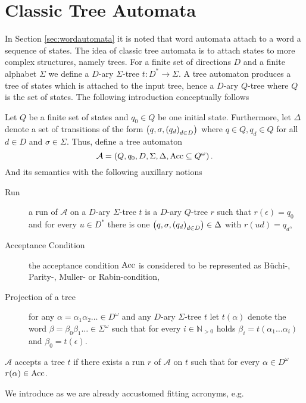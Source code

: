\section{Classic Tree Automata}
In Section \ref{sec:wordautomata} it is noted that word automata attach to a
word a sequence of states. The idea of classic tree automata is to attach
states to more complex structures, namely trees. For a finite set of
directions $D$ and a finite alphabet $\Sigma$ we define a $D$-ary $\Sigma$-tree
$t:D^{*}\rightarrow\Sigma$. A tree automaton produces a tree of states
which is attached to the input tree, hence a $D$-ary $Q$-tree where $Q$ is the
set of states. The following introduction conceptually follows 
\cite[Chapter 8]{AutoLogInfGames}
\begin{definition}
  Let $Q$ be a finite set of states and $q_{0}\in Q$ be one initial state.
  Furthermore, let $\Delta$ denote a set of transitions of the form
  $\left(q,\sigma, \left(q_{d}\right)_{d\in D}\right)$ where $q\in Q, q_{d}\in Q$ for
  all $d\in D$ and $\sigma\in\Sigma$. Thus, define a tree automaton
  \begin{equation*}
    \mathcal{A} = \left(Q, q_{0}, D, \Sigma, \Delta, \operatorname{Acc}\subseteq Q^{\omega}\right).
  \end{equation*}
  And its semantics with the following auxillary notions
  \begin{description}
    \item[Run] a run of $\mathcal{A}$ on a $D$-ary $\Sigma$-tree $t$ is a
      $D$-ary $Q$-tree $r$ such that $r(\epsilon) = q_{0}$ and for every 
      $u\in D^{*}$ there is one 
      $\left(q,\sigma, \left(q_{d}\right)_{d\in D}\right)\in\Delta$ with $r(ud) = q_{d}$,
    \item[Acceptance Condition] the acceptance condition $\operatorname{Acc}$ is considered
      to be represented as Büchi-, Parity-, Muller- or Rabin-condition,
    \item[Projection of a tree] for any $\alpha=\alpha_{1}\alpha_{2}\dots\in
      D^{\omega}$ and any $D$-ary $\Sigma$-tree $t$ let $t(\alpha)$ denote the 
      word $\beta = \beta_{0}\beta_{1}\dots\in\Sigma^{\omega}$ such that for 
      every $i\in\mathbb{N}_{>0}$ holds 
      $\beta_{i} = t(\alpha_{1}\dots\alpha_{i})$ and $\beta_{0} = t(\epsilon)$.
  \end{description}
  $\mathcal{A}$ accepts a tree $t$ if there exists a run $r$ of $\mathcal{A}$
  on $t$ such that for every $\alpha\in D^{\omega}$ $r(\alpha)\in\operatorname{Acc}$.
\end{definition}
We introduce as we are already accustomed fitting acronyms, e.g.
